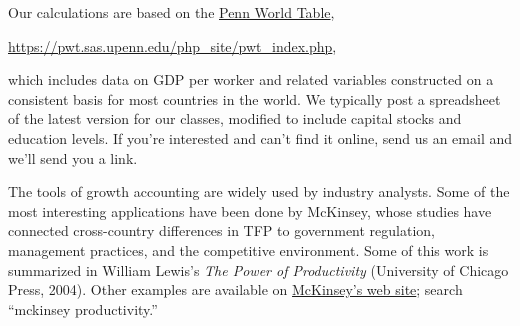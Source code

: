 Our calculations are based on the
\href{https://pwt.sas.upenn.edu/php_site/pwt_index.php}{Penn World Table},

\vspace*{\parskip}
\centerline{\url{https://pwt.sas.upenn.edu/php_site/pwt_index.php},}

which includes data on GDP per worker and related variables constructed
on a consistent basis for most countries in the world.
We typically post a spreadsheet of the latest version for our classes,
modified to include capital stocks and education levels.
If you're interested and can't find it online,
send us an email and we'll send you a link.

The tools of growth accounting are widely used by industry analysts.
Some of the most interesting applications have been done by McKinsey,
whose studies have connected cross-country differences in TFP to
government regulation, management practices, and the competitive environment.
Some of this work is summarized in William Lewis's
{\it The Power of Productivity\/}
(University of Chicago Press, 2004).
Other examples are available on \href{http://www.mckinsey.com/insights/mgi/research/productivity_competitiveness_and_growth}{McKinsey's web site};
search ``mckinsey productivity.''



